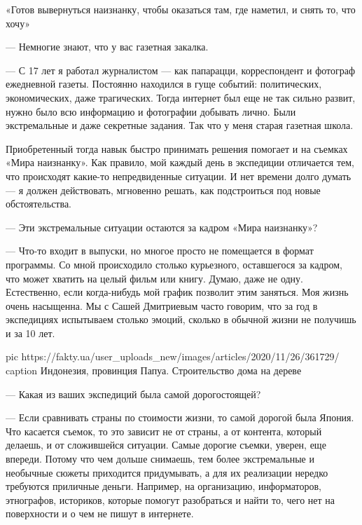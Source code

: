 «Готов вывернуться наизнанку, чтобы оказаться там, где наметил, и снять то, что
хочу»

— Немногие знают, что у вас газетная закалка.

— С 17 лет я работал журналистом — как папарацци, корреспондент и фотограф
ежедневной газеты. Постоянно находился в гуще событий: политических,
экономических, даже трагических. Тогда интернет был еще не так сильно
развит, нужно было всю информацию и фотографии добывать лично. Были
экстремальные и даже секретные задания. Так что у меня старая газетная
школа.

Приобретенный тогда навык быстро принимать решения помогает и на съемках
«Мира наизнанку». Как правило, мой каждый день в экспедиции отличается
тем, что происходят какие-то непредвиденные ситуации. И нет времени долго
думать — я должен действовать, мгновенно решать, как подстроиться под
новые обстоятельства.

— Эти экстремальные ситуации остаются за кадром «Мира наизнанку»?

— Что-то входит в выпуски, но многое просто не помещается в формат
программы. Со мной происходило столько курьезного, оставшегося за кадром,
что может хватить на целый фильм или книгу. Думаю, даже не одну.
Естественно, если когда-нибудь мой график позволит этим заняться. Моя
жизнь очень насыщенна. Мы с Сашей Дмитриевым часто говорим, что за год
в экспедициях испытываем столько эмоций, сколько в обычной жизни
не получишь и за 10 лет.

\ifcmt
pic https://fakty.ua/user_uploads_new/images/articles/2020/11/26/361729/%
caption Индонезия, провинция Папуа. Строительство дома на дереве
\fi


— Какая из ваших экспедиций была самой дорогостоящей?

— Если сравнивать страны по стоимости жизни, то самой дорогой была Япония.
Что касается съемок, то это зависит не от страны, а от контента, который
делаешь, и от сложившейся ситуации. Самые дорогие съемки, уверен, еще
впереди. Потому что чем дольше снимаешь, тем более экстремальные
и необычные сюжеты приходится придумывать, а для их реализации нередко
требуются приличные деньги. Например, на организацию, информаторов,
этнографов, историков, которые помогут разобраться и найти то, чего нет
на поверхности и о чем не пишут в интернете.

